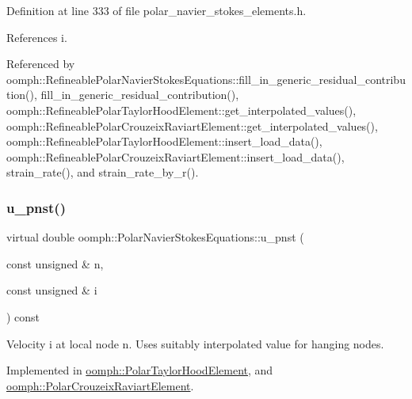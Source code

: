 Definition at line 333 of file polar\+\_\+navier\+\_\+stokes\+\_\+elements.\+h.



References i.



Referenced by oomph\+::\+Refineable\+Polar\+Navier\+Stokes\+Equations\+::fill\+\_\+in\+\_\+generic\+\_\+residual\+\_\+contribution(), fill\+\_\+in\+\_\+generic\+\_\+residual\+\_\+contribution(), oomph\+::\+Refineable\+Polar\+Taylor\+Hood\+Element\+::get\+\_\+interpolated\+\_\+values(), oomph\+::\+Refineable\+Polar\+Crouzeix\+Raviart\+Element\+::get\+\_\+interpolated\+\_\+values(), oomph\+::\+Refineable\+Polar\+Taylor\+Hood\+Element\+::insert\+\_\+load\+\_\+data(), oomph\+::\+Refineable\+Polar\+Crouzeix\+Raviart\+Element\+::insert\+\_\+load\+\_\+data(), strain\+\_\+rate(), and strain\+\_\+rate\+\_\+by\+\_\+r().

\mbox{\label{classoomph_1_1PolarNavierStokesEquations_ae4bfb7b4c54bf5558111f84119f530d0}} 
\subsubsection{\texorpdfstring{u\+\_\+pnst()}{u\_pnst()}\hspace{0.1cm}{\footnotesize\ttfamily [1/2]}}
{\footnotesize\ttfamily virtual double oomph\+::\+Polar\+Navier\+Stokes\+Equations\+::u\+\_\+pnst (\begin{DoxyParamCaption}\item[{const unsigned \&}]{n,  }\item[{const unsigned \&}]{i }\end{DoxyParamCaption}) const\hspace{0.3cm}{\ttfamily [pure virtual]}}



Velocity i at local node n. Uses suitably interpolated value for hanging nodes. 



Implemented in \hyperlink{classoomph_1_1PolarTaylorHoodElement_a7a584a50123314fdfc35798e8c604383}{oomph\+::\+Polar\+Taylor\+Hood\+Element}, and \hyperlink{classoomph_1_1PolarCrouzeixRaviartElement_a9c214952496bbb3e777e7c49d4579377}{oomph\+::\+Polar\+Crouzeix\+Raviart\+Element}.



